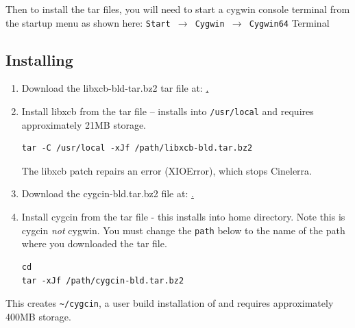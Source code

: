 Then to install the \CGG{} tar files, you will need to start a
cygwin console terminal from the startup menu as shown here:
\texttt{Start $\rightarrow$ Cygwin $\rightarrow$ Cygwin64}
Terminal

\subsection*{Installing \CGG{}}
\label{sec:installing_cinelerra}

\begin{enumerate}
\item Download the libxcb-bld-tar.bz2 tar file at:
  \href{https://download.cinelerra-gg.org/download.php?file=testing\%2Flibxcb-bld.tar.bz2}.

\item Install libxcb from the tar file -- installs into
  \texttt{/usr/local} and requires approximately 21MB storage.
\begin{lstlisting}[style=sh]
tar -C /usr/local -xJf /path/libxcb-bld.tar.bz2
\end{lstlisting}
  The libxcb patch repairs an error (XIOError), which stops
  Cinelerra.

\item Download the cygcin-bld.tar.bz2 file at:
  \href{https://download.cinelerra-gg.org/download.php?file=testing\%2Fcygcin-bld.tar.bz2}.

\item Install cygcin from the tar file - this installs into home
  directory.  Note this is cygcin \emph{not} cygwin. You must change the
  \texttt{path} below to the name of the path where you downloaded
  the tar file.
\begin{lstlisting}[style=sh]
cd
tar -xJf /path/cygcin-bld.tar.bz2
\end{lstlisting}
\end{enumerate}

This creates \texttt{\~{}/cygcin}, a user build installation of
\CGG{} and requires approximately 400MB storage.

